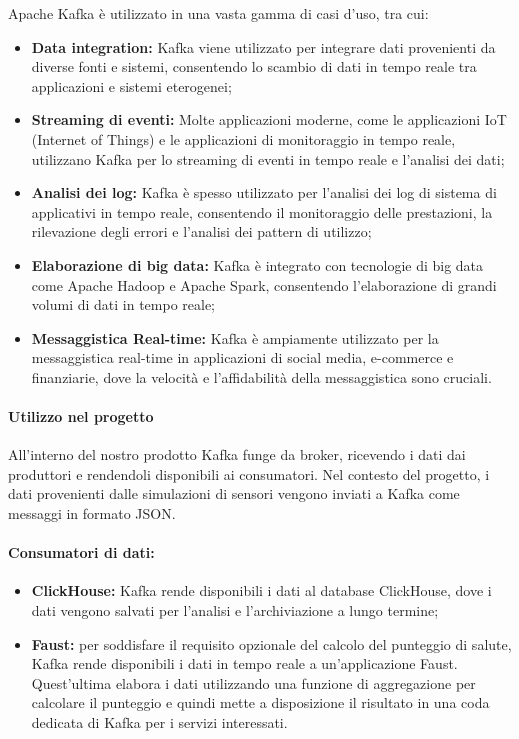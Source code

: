 Apache Kafka è utilizzato in una vasta gamma di casi d'uso, tra cui:

\begin{itemize}
  \item \textbf{Data integration:} Kafka viene utilizzato per integrare dati provenienti da diverse fonti e sistemi, consentendo lo scambio di dati in tempo reale tra applicazioni e sistemi eterogenei;
  
  \item \textbf{Streaming di eventi:} Molte applicazioni moderne, come le applicazioni IoT (Internet of Things) e le applicazioni di monitoraggio in tempo reale, utilizzano Kafka per lo streaming di eventi in tempo reale e l'analisi dei dati;
  
  \item \textbf{Analisi dei log:} Kafka è spesso utilizzato per l'analisi dei log di sistema di applicativi in tempo reale, consentendo il monitoraggio delle prestazioni, la rilevazione degli errori e l'analisi dei pattern di utilizzo;
  
  \item \textbf{Elaborazione di big data:} Kafka è integrato con tecnologie di big data come Apache Hadoop e Apache Spark, consentendo l'elaborazione di grandi volumi di dati in tempo reale;
  
  \item \textbf{Messaggistica Real-time:} Kafka è ampiamente utilizzato per la messaggistica real-time in applicazioni di social media, e-commerce e finanziarie, dove la velocità e l'affidabilità della messaggistica sono cruciali.
\end{itemize}

\paragraph{Utilizzo nel progetto}
All'interno del nostro prodotto Kafka funge da broker, ricevendo i dati dai produttori e rendendoli disponibili ai consumatori. Nel contesto del progetto, i dati provenienti dalle simulazioni di sensori vengono inviati a Kafka come messaggi in formato JSON.

\paragraph*{Consumatori di dati:}
\begin{itemize}
  \item \textbf{ClickHouse:} Kafka rende disponibili i dati al database ClickHouse, dove i dati vengono salvati per l'analisi e l'archiviazione a lungo termine;
  \item \textbf{Faust:} per soddisfare il requisito opzionale del calcolo del punteggio di salute, Kafka rende disponibili i dati in tempo reale a un'applicazione Faust. Quest'ultima elabora i dati utilizzando una funzione di aggregazione per calcolare il punteggio e quindi mette a disposizione il risultato in una coda dedicata di Kafka per i servizi interessati.
\end{itemize}

